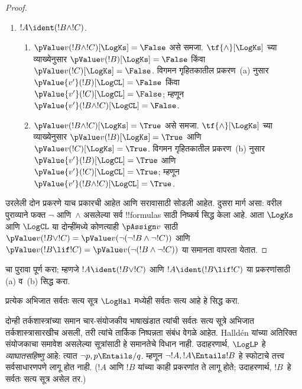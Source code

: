 \documentclass[../../../include/open-logic-section]{subfiles}
\begin{document}
\begin{proof}
\begin{enumerate}
    \item $!A \ident (!B \land !C)$.
    \begin{enumerate}
      \item $\pValue v(!B \land !C)[\LogKs] = \False$ असे समजा.
      $\tf{\land}[\LogKs]$ च्या व्याख्येनुसार
      $\pValue v(!B)[\LogKs]  = \False$ किंवा
      $\pValue v(!C)[\LogKs]  = \False$. विगमन गृहितकातील
      प्रकरण~(a) नुसार $\pValue {v'}(!B)[\LogCL]  = \False$
      किंवा $\pValue {v'}(!C)[\LogCL]  = \False$;
      म्हणून $\pValue {v'}(!B \land !C)[\LogCL] = \False$.
      \item $\pValue v(!B \land !C)[\LogKs] = \True$ असे समजा.
      $\tf{\land}[\LogKs]$ च्या व्याख्येनुसार
      $\pValue v(!B)[\LogKs]  = \True$ आणि
      $\pValue v(!C)[\LogKs]  = \True$. विगमन गृहितकातील
      प्रकरण~(b) नुसार $\pValue {v'}(!B)[\LogCL]  = \True$
      आणि $\pValue {v'}(!C)[\LogCL]  = \True$;
      म्हणून $\pValue {v'}(!B \land !C)[\LogCL] = \True$.
    \end{enumerate}
  \end{enumerate}

  उरलेली दोन प्रकरणे याच प्रकारची आहेत आणि सरावासाठी
  सोडली आहेत. दुसरा मार्ग असा: वरील पुराव्याने फक्त $\lnot$
  आणि~$\land$ असलेल्या सर्व !!{formula}s साठी निष्कर्ष
  सिद्ध केला आहे. आता $\LogKs$ आणि $\LogCL$ या दोन्हींमध्ये
  कोणत्याही $\pAssign v$ साठी $\pValue v(!B \lor
  !C) = \pValue v(\lnot(\lnot!B \land \lnot !C))$ आणि $\pValue v(!B \lif
  !C) = \pValue v(\lnot(!B \land \lnot !C))$ या समानता
  वापरता येतात.
\end{proof}

\begin{prob}
   चा पुरावा पूर्ण
  करा; म्हणजे $!A \ident (!B \lor !C)$ आणि
  $!A \ident (!B \lif !C)$ या प्रकरणांसाठी (a) व~(b)
  सिद्ध करा.
\end{prob}

\begin{prob}
प्रत्येक अभिजात सर्वतः सत्य सूत्र $\LogHal$ मध्येही
सर्वतः सत्य आहे हे सिद्ध करा.
\end{prob}

दोन्ही तर्कशास्त्रांच्या समान चार-संयोजकीय भाषाखंडात त्यांची
सर्वतः सत्य सूत्रे अभिजात तर्कशास्त्रासारखीच असली, तरी त्यांचे
तार्किक निष्पन्नता संबंध वेगळे आहेत. Halld\'en यांच्या अतिरिक्त
संयोजकाचा समावेश असलेल्या सूत्रांसाठी हे समानतेचे विधान नाही. उदाहरणार्थ,
$\LogLP$ हे \emph{व्याघातसहिष्णु} आहे: त्यात
$\lnot p, p \Entails/ q$. म्हणून
$\lnot !A, !A \Entails !B$ हे स्फोटाचे तत्त्व सर्वसाधारणपणे
लागू होत नाही. ($!A$ आणि $!B$ यांच्या काही प्रकरणांत
ते लागू होते; उदाहरणार्थ, $!B$~हे सर्वतः सत्य सूत्र असेल तर.)
\end{document}

